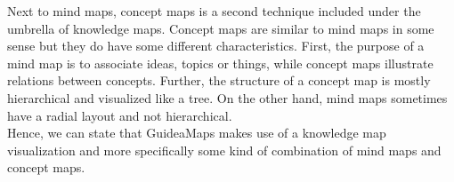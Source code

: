 Next to mind maps, concept maps is a second technique included under the umbrella of knowledge maps. Concept maps are similar to mind maps in some sense but they do have some different characteristics. First, the purpose of a mind map is to associate ideas, topics or things, while concept maps illustrate relations between concepts. Further, the structure of a concept map is mostly hierarchical and visualized like a tree. On the other hand, mind maps sometimes have a radial layout and not hierarchical. \citep{davies} \\

Hence, we can state that GuideaMaps makes use of a knowledge map visualization and more specifically some kind of combination of mind maps and concept maps.